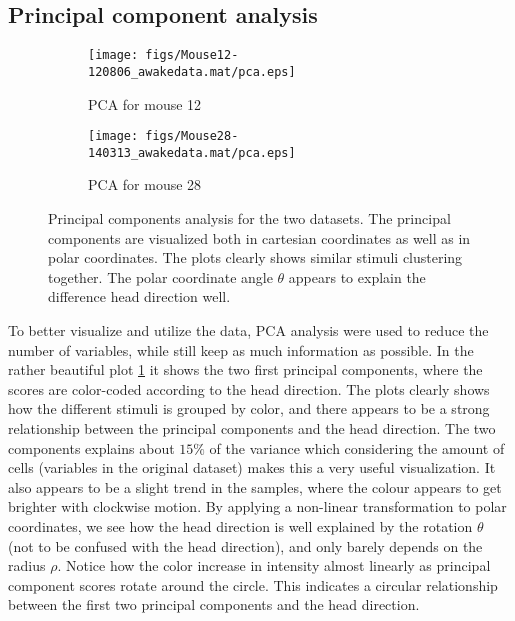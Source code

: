 \subsection{Principal component analysis}
\begin{figure}[H]
    \centering
    \begin{subfigure}[b]{0.49\textwidth}
        \texttt{[image: figs/Mouse12-120806\_awakedata.mat/pca.eps]}
        \caption{PCA for mouse 12}
    \end{subfigure}
    \begin{subfigure}[b]{0.49\textwidth}
        \texttt{[image: figs/Mouse28-140313\_awakedata.mat/pca.eps]}
        \caption{PCA for mouse 28}

    \end{subfigure}
    \caption{Principal components analysis for the two datasets. The principal components are visualized both in cartesian coordinates as well as in polar coordinates. The plots clearly shows similar stimuli clustering together. The polar coordinate angle $\theta$ appears to explain the difference head direction well.}
    \label{fig:pca}
\end{figure}
To better visualize and utilize the data, PCA analysis were used to reduce the number of variables, while still keep as much information as possible. In the rather beautiful plot \cref{fig:pca} it shows the two first principal components, where the scores are color-coded according to the head direction. The plots clearly shows how the different stimuli is grouped by color, and there appears to be a strong relationship between the principal components and the head direction. The two components explains about $15\%$ of the variance which considering the amount of cells (variables in the original dataset) makes this a very useful visualization. 
It also appears to be a slight trend in the samples, where the colour appears to get brighter with clockwise motion. By applying a non-linear transformation to polar coordinates, we see how the head direction is well explained by the rotation $\theta$ (not to be confused with the head direction), and only barely depends on the radius $\rho$. Notice how the color increase in intensity almost linearly as principal component scores rotate around the circle. This indicates a circular relationship between the first two principal components and the head direction. 
